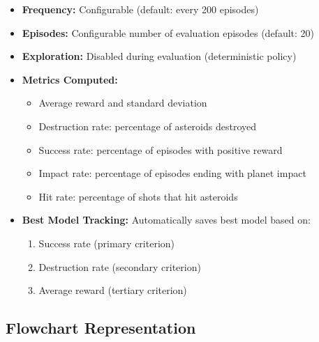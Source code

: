 \begin{itemize}
    \item \textbf{Frequency:} Configurable (default: every 200 episodes)
    \item \textbf{Episodes:} Configurable number of evaluation episodes (default: 20)
    \item \textbf{Exploration:} Disabled during evaluation (deterministic policy)
    \item \textbf{Metrics Computed:}
    \begin{itemize}
        \item Average reward and standard deviation
        \item Destruction rate: percentage of asteroids destroyed
        \item Success rate: percentage of episodes with positive reward
        \item Impact rate: percentage of episodes ending with planet impact
        \item Hit rate: percentage of shots that hit asteroids
    \end{itemize}
    \item \textbf{Best Model Tracking:} Automatically saves best model based on:
    \begin{enumerate}
        \item Success rate (primary criterion)
        \item Destruction rate (secondary criterion)
        \item Average reward (tertiary criterion)
    \end{enumerate}
\end{itemize}

\subsection{Flowchart Representation}


